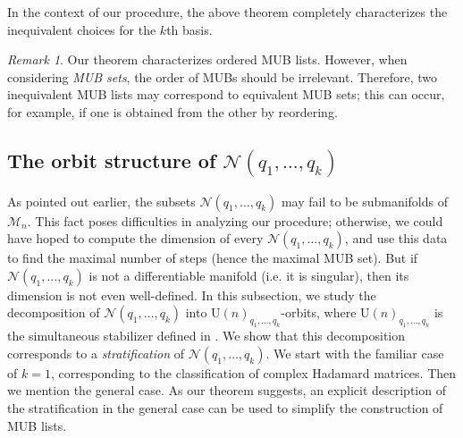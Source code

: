 \documentclass[referee,sn-mathphys-num]{sn-jnl}%
\theoremstyle{thmstyleone}%
\theoremstyle{thmstyletwo}%
\theoremstyle{remark}
\newtheorem*{remark*}{Remark}%
\theoremstyle{thmstylethree}%
\begin{document}
In the context of our procedure, the above theorem completely characterizes the inequivalent choices for the $k$th basis.
\begin{remark*}
	Our theorem characterizes ordered MUB lists. However, when considering \textit{MUB sets}, the order of MUBs should be irrelevant. Therefore, two inequivalent MUB lists may correspond to equivalent MUB sets; this can occur, for example, if one is obtained from the other by reordering.
\end{remark*}

\subsection{The orbit structure of $ \mathcal{N} \left( q_1, \ldots, q_{k} \right) $}\label{sec:orbit_structure}
As pointed out earlier, the subsets $ \mathcal{N} \left( q_1, \ldots, q_{k} \right) $ may fail to be submanifolds of $\mathcal{M}_n$. This fact poses difficulties in analyzing our procedure; otherwise, we could have hoped to compute the dimension of every $ \mathcal{N} \left( q_1, \ldots, q_{k} \right) $, and use this data to find the maximal number of steps (hence the maximal MUB set). But if $ \mathcal{N} \left( q_1, \ldots, q_{k} \right) $ is not a differentiable manifold (i.e. it is singular), then its dimension is not even well-defined. In this subsection, we study the decomposition of $ \mathcal{N} \left( q_1, \ldots, q_{k} \right) $ into $\mathrm{U} \left( n \right)_{q_1, \ldots, q_k }$-orbits, where $\mathrm{U} \left( n \right)_{q_1, \ldots, q_k }$ is the simultaneous stabilizer defined in . We show that this decomposition corresponds to a \textit{stratification} of $ \mathcal{N} \left( q_1, \ldots, q_{k} \right) $.
We start with the familiar case of $k=1$, corresponding to the classification of complex Hadamard matrices. Then we mention the general case. 
As our theorem suggests, an explicit description of the stratification in the general case can be used to simplify the construction of MUB lists.
\end{document}
